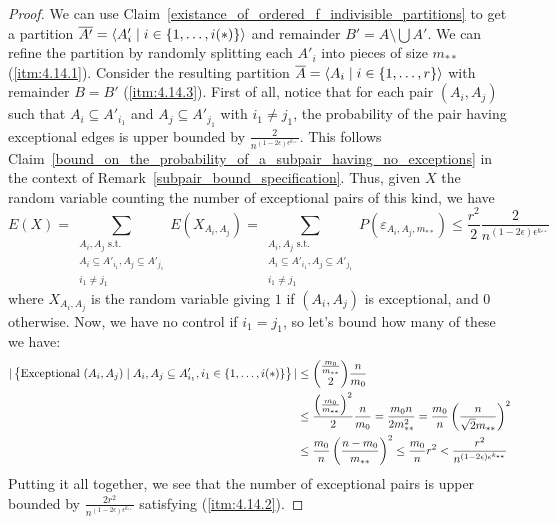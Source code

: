         \begin{proof}
            We can use Claim~\ref{existance_of_ordered_f_indivisible_partitions} to get a partition
            $\overline{A'} = \left< A'_i \mid i \in \left\{ 1, \dots, i(*) \right\} \right>$ and remainder $B' = A \setminus \bigcup A'$.
            We can refine the partition by randomly splitting each $A'_i$ into pieces of size $m_{**}$ (\ref{itm:4.14.1}).
            Consider the resulting partition $\overline{A} = \left< A_i \mid i \in \left\{ 1, \dots, r \right\} \right>$ with remainder $B = B'$
            (\ref{itm:4.14.3}).
            First of all, notice that for each pair $(A_i, A_j)$ such that $A_i \subseteq A'_{i_1}$ and
            $A_j \subseteq A'_{j_1}$ with $i_1 \neq j_1$, the probability of the pair having exceptional edges is
            upper bounded by $\frac{2}{n^{(1-2\epsilon)\epsilon^{k_{**}}}}$.
            This follows Claim~\ref{bound_on_the_probability_of_a_subpair_having_no_exceptions} in the context of
            Remark~\ref{subpair_bound_specification}.
            Thus, given $X$ the random variable counting the number of exceptional pairs of this kind, we have
            \[
                E(X) = \sum_{\substack{A_i,A_j \text{ s.t.}\\A_i\subseteq A'_{i_1},A_j\subseteq A'_{j_1}\\i_1\neq j_1}} E(X_{A_i, A_j})
                     = \sum_{\substack{A_i,A_j \text{ s.t.}\\A_i\subseteq A'_{i_1},A_j\subseteq A'_{j_1}\\i_1\neq j_1}} P(\varepsilon_{A_i, A_j,m_{**}})
                     \leq \frac{r^2}{2} \frac{2}{n^{(1-2\epsilon)\epsilon^{k_{**}}}}
            \]
            where $X_{A_i,A_j}$ is the random variable giving $1$ if $(A_i, A_j)$ is exceptional, and $0$ otherwise.
            Now, we have no control if $i_1 = j_1$, so let's bound how many of these we have:
            \[
                \begin{split}
                    |\left\{ \text{Exceptional } (A_i, A_j) \mid A_i, A_j \subseteq A'_{i_1}, i_1 \in \left\{ 1, \dots, i(*) \right\} \right\}|
                        & \leq {\frac{m_0}{m_{**}} \choose 2} \frac{n}{m_0} \\
                        & \leq \frac{\left( \frac{m_0}{m_{**}} \right)^2}{2} \frac{n}{m_0}
                            = \frac{m_0 n}{2 m_{**}^2}
                            = \frac{m_0}{n} \left( \frac{n}{\sqrt{2}m_{**}} \right)^2 \\
                        & \leq \frac{m_0}{n} \left( \frac{n - m_0}{m_{**}} \right)^2
                            \leq \frac{m_0}{n} r^2
                            < \frac{r^2}{n^{(1-2\epsilon) \epsilon^{k_{**}}}}
                \end{split}
            \]
            Putting it all together, we see that the number of exceptional pairs is upper bounded by
                $\frac{2r^2}{n^{(1-2\epsilon)\epsilon^{k_{**}}}}$ satisfying (\ref{itm:4.14.2}).
        \end{proof}

